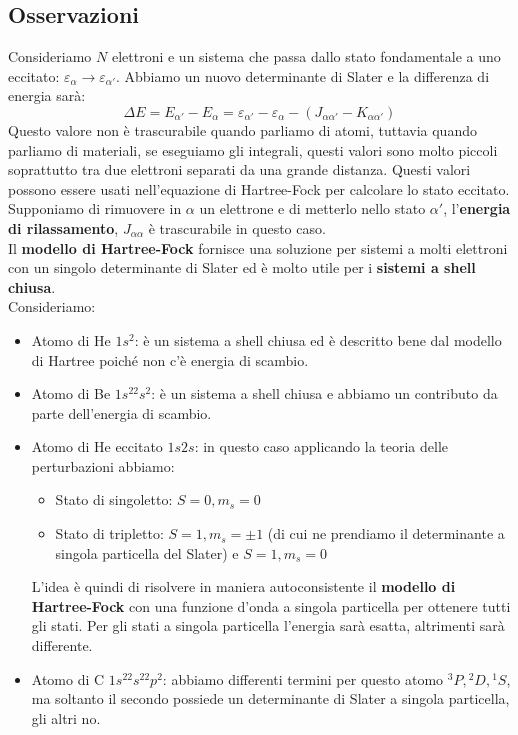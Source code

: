 \subsection*{Osservazioni}
Consideriamo $N$ elettroni e un sistema che passa dallo stato fondamentale a uno eccitato: $\varepsilon_\alpha \rightarrow \varepsilon_{\alpha'}$. Abbiamo un nuovo determinante di Slater e la differenza di energia sarà:
\begin{equation*}
    \Delta E = E_{\alpha'}-E_\alpha=\varepsilon_{\alpha'}-\varepsilon_\alpha - (J_{\alpha\alpha'}-K_{\alpha\alpha'})
\end{equation*}
Questo valore non è trascurabile quando parliamo di atomi, tuttavia quando parliamo di materiali, se eseguiamo gli integrali, questi valori sono molto piccoli soprattutto tra due elettroni separati da una grande distanza. Questi valori possono essere usati nell'equazione di Hartree-Fock per calcolare lo stato eccitato. Supponiamo di rimuovere in $\alpha$ un elettrone e di metterlo nello stato $\alpha'$, l'\textbf{energia di rilassamento}, $J_{\alpha\alpha}$ è trascurabile in questo caso.\\
Il \textbf{modello di Hartree-Fock} fornisce una soluzione per sistemi a molti elettroni con un singolo determinante di Slater ed è molto utile per i \textbf{sistemi a shell chiusa}.\\
Consideriamo:
\begin{itemize}
    \item Atomo di He $1s^2$: è un sistema a shell chiusa ed è descritto bene dal modello di Hartree poiché non c'è energia di scambio.
    \item Atomo di Be $1s^22s^2$: è un sistema a shell chiusa e abbiamo un contributo da parte dell'energia di scambio.
    \item Atomo di He eccitato $1s2s$: in questo caso applicando la teoria delle perturbazioni abbiamo:
    \begin{itemize}
        \item Stato di singoletto: $S=0, m_s=0$
        \item Stato di tripletto: $S=1, m_s=\pm 1$ (di cui ne prendiamo il determinante a singola particella del Slater) e $S=1, m_s= 0$
    \end{itemize}
    L'idea è quindi di risolvere in maniera autoconsistente il \textbf{modello di Hartree-Fock} con una funzione d'onda a singola particella per ottenere tutti gli stati. Per gli stati a singola particella l'energia sarà esatta, altrimenti sarà differente.
    \item Atomo di C $1s^22s^22p^2$: abbiamo differenti termini per questo atomo ${}^3P, {}^2D, {}^1S$, ma soltanto il secondo possiede un determinante di Slater a singola particella, gli altri no.
\end{itemize}
